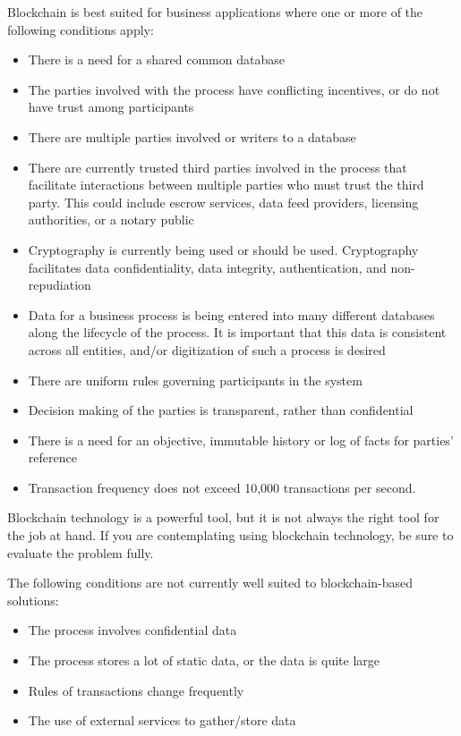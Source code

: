 Blockchain is best suited for business applications where one or more of the following conditions apply:
\begin{itemize}
	\item There is a need for a shared common database
	\item The parties involved with the process have conflicting incentives, or do not have trust among participants
	\item There are multiple parties involved or writers to a database
	\item There are currently trusted third parties involved in the process that facilitate interactions between multiple parties who must trust the third party. This could include escrow services, data feed providers, licensing authorities, or a notary public
	\item Cryptography is currently being used or should be used. Cryptography facilitates data confidentiality, data integrity, authentication, and non-repudiation
	\item Data for a business process is being entered into many different databases along the lifecycle of the process. It is important that this data is consistent across all entities, and/or digitization of such a process is desired
	\item There are uniform rules governing participants in the system
	\item Decision making of the parties is transparent, rather than confidential
	\item There is a need for an objective, immutable history or log of facts for parties’ reference
	\item Transaction frequency does not exceed 10,000 transactions per second.
\end{itemize}

Blockchain technology is a powerful tool, but it is not always the right tool for the job at hand. If you are contemplating using blockchain technology, be sure to evaluate the problem fully.

The following conditions are not currently well suited to blockchain-based solutions:
\begin{itemize}
	\item The process involves confidential data
	\item The process stores a lot of static data, or the data is quite large
	\item Rules of transactions change frequently
	\item The use of external services to gather/store data
\end{itemize}

